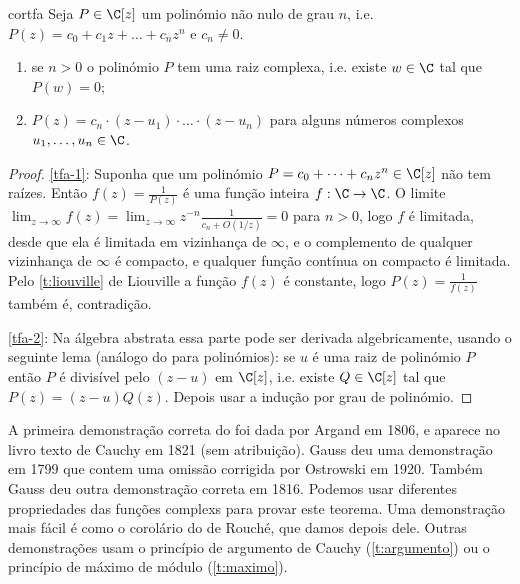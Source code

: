 \begin{restatable}{cor}{tfa} \label{t:fundamental-algebra}
\label{teorema-fundamental-algebra}
Seja $P\in\C[z]$ um polinómio não nulo de grau $n$, i.e.
$P(z) = c_0 + c_1 z + \dots + c_n z^n$ e $c_n\neq 0$.
\begin{enumerate}
\item \label{tfa-1} se $n>0$ o polinómio $P$ tem uma raiz complexa,
i.e. existe $w\in\C$ tal que $P(w) = 0$;
\item \label{tfa-2} $P(z) = c_n \cdot (z-u_1) \cdot \dots \cdot (z-u_n)$
para alguns números complexos $u_1,\dots,u_n\in\C$.
\end{enumerate}
\end{restatable}
\begin{proof}
\eqref{tfa-1}: Suponha que um polinómio $P = c_0 + \dots + c_n z^n \in\C[z]$ não tem raízes.
Então $f(z) = \frac{1}{P(z)}$ é uma função inteira $f: \C\to\C$.
O limite $\lim_{z\to\infty} f(z) = \lim_{z\to\infty} z^{-n} \frac{1}{c_n + O(1/z)} = 0$ para $n>0$,
logo $f$ é limitada, desde que ela é limitada em vizinhança de $\infty$,
e o complemento de qualquer vizinhança de $\infty$ é compacto,
e qualquer função contínua on compacto é limitada.
Pelo \cref{t:liouville} de Liouville a função $f(z)$ é constante,
logo $P(z) = \frac{1}{f(z)}$ também é, contradição.

\eqref{tfa-2}: Na álgebra abstrata essa parte pode ser derivada algebricamente,
usando o seguinte lema (análogo do  para polinómios):
se $u$ é uma raiz de polinómio $P$ então $P$ é divisível pelo $(z-u)$ em $\C[z]$,
i.e. existe $Q\in\C[z]$ tal que $P(z) = (z-u) Q(z)$. Depois usar a indução por grau de polinómio.
\end{proof}

\begin{remark}
A primeira demonstração correta do 
foi dada por Argand em 1806, e aparece no livro texto de Cauchy em 1821
(sem atribuição). Gauss deu uma demonstração em 1799 que contem uma omissão corrigida por Ostrowski em 1920.
Também Gauss deu outra demonstração correta em 1816.
Podemos usar diferentes propriedades das funções complexs para provar este teorema.
Uma demonstração mais fácil é como o corolário do  de Rouché,
que damos depois dele. Outras demonstrações usam o princípio de argumento de Cauchy (\cref{t:argumento})
ou o princípio de máximo de módulo (\cref{t:maximo}).
\end{remark}


